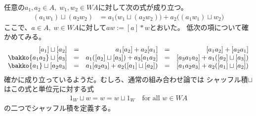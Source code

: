 	\begin{todo}[シャッフル積の性質]\label{todo:シャッフル積の性質} %
		任意の$a_1,a_2\in A,\;w_{1},w_{2}\in WA$に対して次の式が成り立つ。
		\begin{equation*}\begin{split} %
			(a_1w_1)\sqcup(a_2w_2)
			&= a_1\bigl(w_1\sqcup(a_2w_2)\bigr)
			 + a_2\bigl((a_1w_1)\sqcup w_2\bigr)
		\end{split}\end{equation*} %
		ここで、$a\in A,\;w\in WA$に対して$aw:=[a]*w$とおいた。
		低次の項について確かめてみる。
		\begin{equation*}\begin{array}{rcrcr} %
			[a_1]\sqcup[a_2] &=& a_1[a_2] + a_2[a_1] &=& [a_1a_2] + [a_2a_1] \\
			\bakko{a_1a_2}\sqcup[a_3] &=& a_1([a_2]\sqcup[a_3]) + a_3[a_1a_2]
			&=& [a_3a_1a_2] + a_1([a_2]\sqcup[a_3]) \\
			\bakko{a_1}\sqcup[a_2a_3] &=& a_1[a_2a_3] + a_2([a_1]\sqcup[a_2])
			&=& [a_1a_2a_3] + a_2([a_1]\sqcup[a_2]) \\
		\end{array}\end{equation*} %
		確かに成り立っているようだ。むしろ、通常の組み合わせ論では
		シャッフル積$\sqcup$はこの式と単位元に対する式
		\begin{equation*}\begin{split} %
			1_W\sqcup w = w = w\sqcup 1_W \quad\text{for all }w\in WA
		\end{split}\end{equation*} %
		の二つでシャッフル積を定義する。
	\end{todo} %
